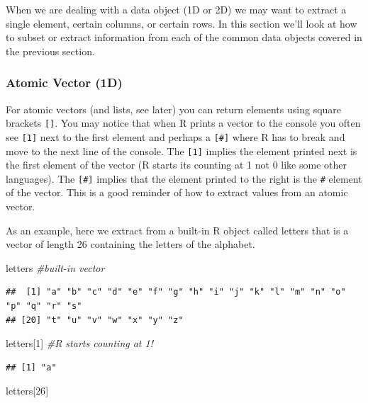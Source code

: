 \documentclass[
]{book}
\newenvironment{Shaded}{\begin{snugshade}}{\end{snugshade}}
\newcommand{\CommentTok}[1]{\textcolor[rgb]{0.56,0.35,0.01}{\textit{#1}}}
\newcommand{\DecValTok}[1]{\textcolor[rgb]{0.00,0.00,0.81}{#1}}
\newcommand{\NormalTok}[1]{#1}
\theoremstyle{definition}
\theoremstyle{definition}
\theoremstyle{definition}
\theoremstyle{remark}
\begin{document}
When we are dealing with a data object (1D or 2D) we may want to extract a single element, certain columns, or certain rows. In this section we'll look at how to subset or extract information from each of the common data objects covered in the previous section.

\hypertarget{atomic-vector-1d-1}{%
\subsubsection{Atomic Vector (1D)}\label{atomic-vector-1d-1}}

For atomic vectors (and lists, see later) you can return elements using square brackets \texttt{{[}{]}}. You may notice that when R prints a vector to the console you often see \texttt{{[}1{]}} next to the first element and perhaps a \texttt{{[}\#{]}} where R has to break and move to the next line of the console. The \texttt{{[}1{]}} implies the element printed next is the first element of the vector (R starts its counting at 1 not 0 like some other languages). The \texttt{{[}\#{]}} implies that the element printed to the right is the \texttt{\#} element of the vector. This is a good reminder of how to extract values from an atomic vector.

As an example, here we extract from a built-in R object called letters that is a vector of length 26 containing the letters of the alphabet.

\begin{Shaded}
\begin{Highlighting}[]
\NormalTok{letters }\CommentTok{#built-in vector}
\end{Highlighting}
\end{Shaded}

\begin{verbatim}
##  [1] "a" "b" "c" "d" "e" "f" "g" "h" "i" "j" "k" "l" "m" "n" "o" "p" "q" "r" "s"
## [20] "t" "u" "v" "w" "x" "y" "z"
\end{verbatim}

\begin{Shaded}
\begin{Highlighting}[]
\NormalTok{letters[}\DecValTok{1}\NormalTok{] }\CommentTok{#R starts counting at 1!}
\end{Highlighting}
\end{Shaded}

\begin{verbatim}
## [1] "a"
\end{verbatim}

\begin{Shaded}
\begin{Highlighting}[]
\NormalTok{letters[}\DecValTok{26}\NormalTok{]}
\end{Highlighting}
\end{Shaded}
\end{document}

